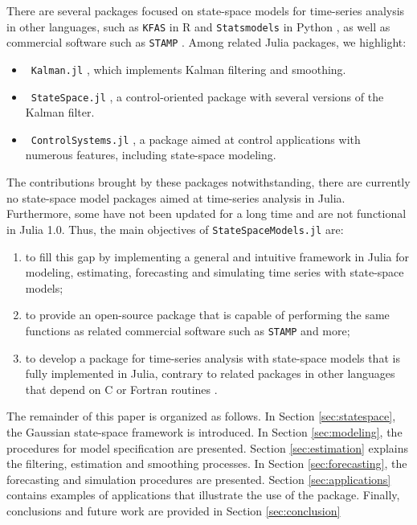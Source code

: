 \documentclass{juliacon}
\begin{document}
There are several packages focused on state-space models for time-series analysis in other languages, such as \texttt{KFAS} in R \cite{kfas} and \texttt{Statsmodels} in Python \cite{seabold2010statsmodels}, as well as commercial software such as \texttt{STAMP} \cite{koopman2000stamp}. Among related Julia packages, we highlight:
\begin{itemize}
    \item ~\texttt{Kalman.jl} \cite{kalmanjl}, which implements Kalman filtering and smoothing.
    \item ~\texttt{StateSpace.jl} \cite{statespacejl}, a control-oriented package with several versions of the Kalman filter.
    \item ~\texttt{ControlSystems.jl} \cite{controlsystemsjl}, a package aimed at control applications with numerous features, including state-space modeling.
\end{itemize}

The contributions brought by these packages notwithstanding, there are currently no state-space model packages aimed at time-series analysis in Julia. Furthermore, some have not been updated for a long time and are not functional in Julia 1.0. Thus, the main objectives of \texttt{StateSpaceModels.jl} \cite{statespacemodels} are:

\begin{enumerate}
    \item to fill this gap by implementing a general and intuitive framework in Julia for modeling, estimating, forecasting and simulating time series with state-space models;
    \item to provide an open-source package that is capable of performing the same functions as related commercial software such as \texttt{STAMP} and more;
    \item to develop a package for time-series analysis with state-space models that is fully implemented in Julia, contrary to related packages in other languages that depend on C or Fortran \mbox{routines} \cite{kfas}.
\end{enumerate}

The remainder of this paper is organized as follows. In Section \ref{sec:statespace}, the Gaussian state-space framework is introduced. In Section \ref{sec:modeling}, the procedures for model specification are presented. Section \ref{sec:estimation} explains the filtering, estimation and smoothing processes. In Section \ref{sec:forecasting}, the forecasting and simulation procedures are presented. Section \ref{sec:applications} contains examples of applications that illustrate the use of the package. Finally, conclusions and future work are provided in Section \ref{sec:conclusion}
\end{document}
